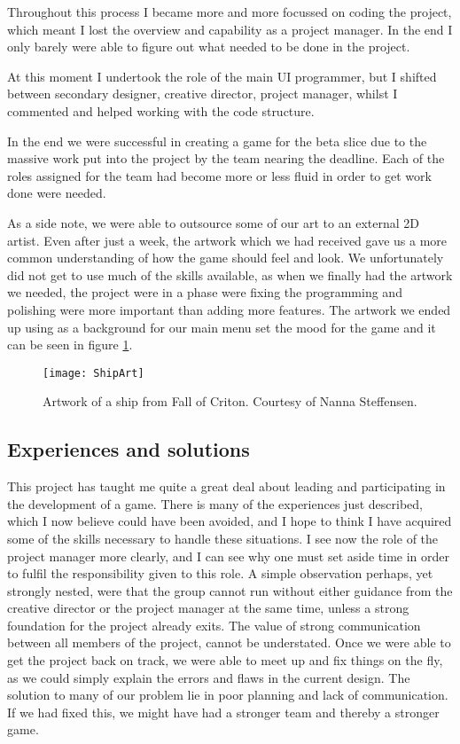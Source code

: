 \documentclass[a4paper,11pt]{article}
\begin{document}
Throughout this process I became more and more focussed on coding the project, which meant I lost the overview and capability as a project manager. In the end I only barely were able to figure out what needed to be done in the project.

At this moment I undertook the role of the main UI programmer, but I shifted between secondary designer, creative director, project manager, whilst I commented and helped working with the code structure.

In the end we were successful in creating a game for the beta slice due to the massive work put into the project by the team nearing the deadline. Each of the roles assigned for the team had become more or less fluid in order to get work done were needed.

As a side note, we were able to outsource some of our art to an external 2D artist. Even after just a week, the artwork which we had received gave us a more common understanding of how the game should feel and look. We unfortunately did not get to use much of the skills available, as when we finally had the artwork we needed, the project were in a phase were fixing the programming and polishing were more important than adding more features. The artwork we ended up using as a background for our main menu set the mood for the game and it can be seen in figure \ref{ArtShip}.

\begin{figure}[h]
	\centering
	\texttt{[image: ShipArt]}
	\caption{Artwork of a ship from Fall of Criton. Courtesy of Nanna Steffensen.}
	\label{ArtShip}
\end{figure}
\subsection{Experiences and solutions}
This project has taught me quite a great deal about leading and participating in the development of a game. There is many of the experiences just described, which I now believe could have been avoided, and I hope to think I have acquired some of the skills necessary to handle these situations.
I see now the role of the project manager more clearly, and I can see why one must set aside time in order to fulfil the responsibility given to this role. 
A simple observation perhaps, yet strongly nested, were that the group cannot run without either guidance from the creative director or the project manager at the same time, unless a strong foundation for the project already exits.  
The value of strong communication between all members of the project, cannot be understated. Once we were able to get the project back on track, we were able to meet up and fix things on the fly, as we could simply explain the errors and flaws in the current design. 
The solution to many of our problem lie in poor planning and lack of communication. If we had fixed this, we might have had a stronger team and thereby a stronger game. 
\end{document}
